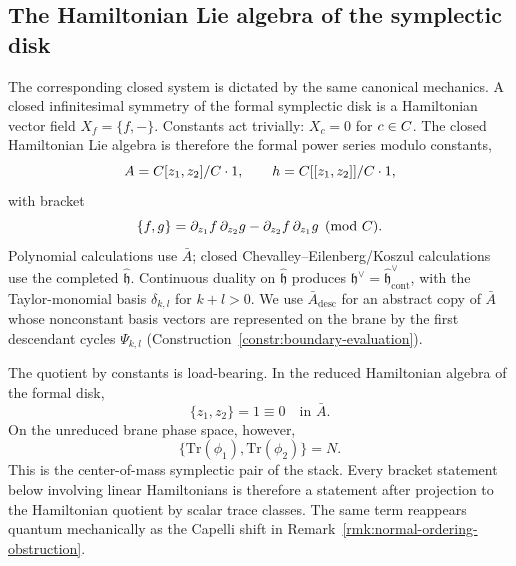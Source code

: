 \documentclass[11pt]{memoir}
\begin{document}
\subsection{The Hamiltonian Lie algebra of the symplectic disk}

The corresponding closed system is dictated by the same canonical mechanics.
A closed infinitesimal symmetry of the formal symplectic disk is a
Hamiltonian vector field $X_f=\{f,-\}$. Constants act trivially: $X_c=0$ for
$c\in C$. The closed Hamiltonian Lie algebra is therefore the formal power
series modulo constants,
\begin{equation}\label{eq:hbar-Lie-algebra}
A=C[z_1,z_2]/C\cdot1,\qquad
h=C[[z_1,z_2]]/C\cdot1,
\end{equation}
with bracket
$$\{f,g\}=\partial_{z_1}f\,\partial_{z_2}g
  -\partial_{z_2}f\,\partial_{z_1}g\pmod{C}.$$
Polynomial calculations use $\bar A$; closed
Chevalley--Eilenberg/Koszul calculations use the completed
$\widehat{\mathfrak h}$. Continuous duality on $\widehat{\mathfrak h}$
produces $\mathfrak h^\vee=\widehat{\mathfrak h}^\vee_{\mathrm{cont}}$, with
the Taylor-monomial basis $\delta_{k,l}$ for $k+l>0$. We use
$\bar A_{\mathrm{desc}}$ for an abstract copy of $\bar A$ whose nonconstant
basis vectors are represented on the brane by the first descendant cycles
$\Psi_{k,l}$ (Construction~\ref{constr:boundary-evaluation}).

\begin{rmk}\label{rmk:scalar-hamiltonian-center-of-mass}
  The quotient by constants is load-bearing. In the reduced Hamiltonian
  algebra of the formal disk,
  $$\{z_1,z_2\}=1\equiv0\quad\text{in }\bar A.$$
  On the unreduced brane phase space, however,
  $$\{\mathrm{Tr}(\phi_1),\mathrm{Tr}(\phi_2)\}=N.$$
  This is the center-of-mass symplectic pair of the stack. Every bracket
  statement below involving linear Hamiltonians is therefore a statement after
  projection to the Hamiltonian quotient by scalar trace classes. The same
  term reappears quantum mechanically as the Capelli shift in
  Remark~\ref{rmk:normal-ordering-obstruction}.
\end{rmk}
\end{document}
